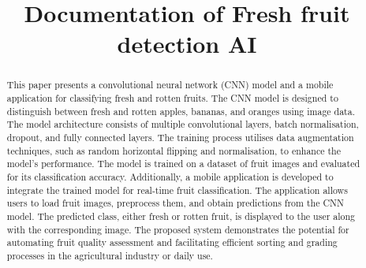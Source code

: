 \documentclass[conference]{IEEEtran}
\begin{document}
\title{Documentation of Fresh fruit detection AI}

\author{
\and
{}
\and
{}
}
\maketitle

\begin{abstract}
This paper presents a convolutional neural network (CNN) model and a mobile application for classifying fresh and rotten fruits. The CNN model is designed to distinguish between fresh and rotten apples, bananas, and oranges using image data. The model architecture consists of multiple convolutional layers, batch normalisation, dropout, and fully connected layers. The training process utilises data augmentation techniques, such as random horizontal flipping and normalisation, to enhance the model's performance. The model is trained on a dataset of fruit images and evaluated for its classification accuracy. Additionally, a mobile application is developed to integrate the trained model for real-time fruit classification. The application allows users to load fruit images, preprocess them, and obtain predictions from the CNN model. The predicted class, either fresh or rotten fruit, is displayed to the user along with the corresponding image. The proposed system demonstrates the potential for automating fruit quality assessment and facilitating efficient sorting and grading processes in the agricultural industry or daily use.
\end{abstract}
\end{document}
